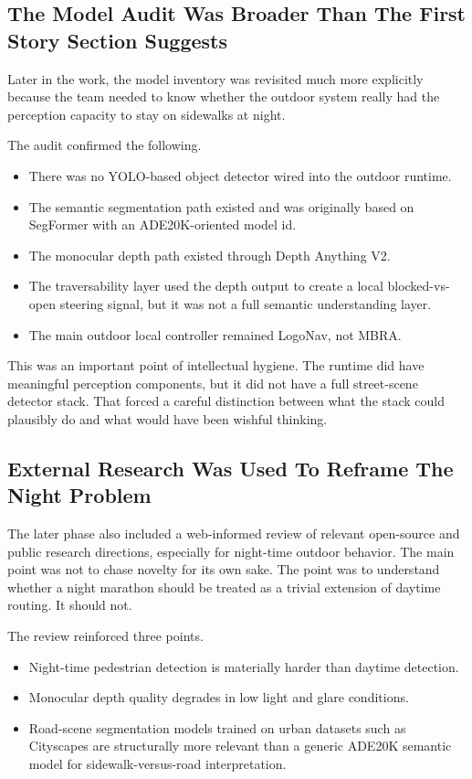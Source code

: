 \documentclass[11pt]{article}
\begin{document}
\subsection{The Model Audit Was Broader Than The First Story Section Suggests}
Later in the work, the model inventory was revisited much more explicitly because the team needed to know whether the outdoor system really had the perception capacity to stay on sidewalks at night.

The audit confirmed the following.
\begin{itemize}[leftmargin=*]
\item There was no YOLO-based object detector wired into the outdoor runtime.
\item The semantic segmentation path existed and was originally based on SegFormer with an ADE20K-oriented model id.
\item The monocular depth path existed through Depth Anything V2.
\item The traversability layer used the depth output to create a local blocked-vs-open steering signal, but it was not a full semantic understanding layer.
\item The main outdoor local controller remained LogoNav, not MBRA.
\end{itemize}

This was an important point of intellectual hygiene. The runtime did have meaningful perception components, but it did not have a full street-scene detector stack. That forced a careful distinction between what the stack could plausibly do and what would have been wishful thinking.

\subsection{External Research Was Used To Reframe The Night Problem}
The later phase also included a web-informed review of relevant open-source and public research directions, especially for night-time outdoor behavior. The main point was not to chase novelty for its own sake. The point was to understand whether a night marathon should be treated as a trivial extension of daytime routing. It should not.

The review reinforced three points.
\begin{itemize}[leftmargin=*]
\item Night-time pedestrian detection is materially harder than daytime detection.
\item Monocular depth quality degrades in low light and glare conditions.
\item Road-scene segmentation models trained on urban datasets such as Cityscapes are structurally more relevant than a generic ADE20K semantic model for sidewalk-versus-road interpretation.
\end{itemize}
\end{document}
